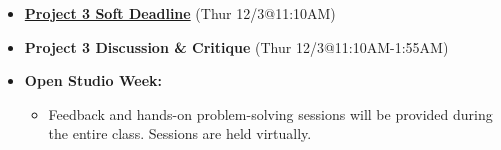 \def\tues{12/1}%
\def\thur{12/3}%
% 
\begin{itemize}[noitemsep,topsep=0pt,leftmargin=*]
    \item \textcolor{defaultColor}{\ul{\textbf{Project 3 Soft Deadline}} (Thur \thur @11:10AM)}
    \item \textcolor{defaultColor}{\textbf{Project 3 Discussion \& Critique} (Thur \thur @11:10AM-1:55AM)}
    \item \textbf{Open Studio Week:}
    \begin{itemize}
        \item Feedback and hands-on problem-solving sessions will be provided during the entire class. Sessions are held virtually. 
    \end{itemize}
\end{itemize}